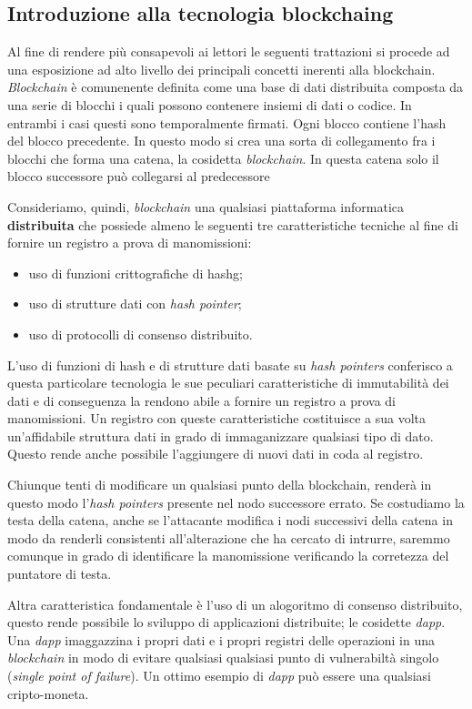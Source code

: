 \subsection{Introduzione alla tecnologia \gls{blockchaing}}
Al fine di rendere più consapevoli ai lettori le seguenti trattazioni si procede ad una esposizione ad alto livello dei principali concetti inerenti alla blockchain.
\emph{Blockchain} è comunenente definita come una base di dati distribuita composta da una serie di blocchi i quali possono contenere insiemi di dati o codice. In entrambi i casi questi sono temporalmente firmati.
Ogni blocco contiene l'hash del blocco precedente. In questo modo si crea una sorta di collegamento fra i blocchi che forma una catena, la cosidetta \emph{blockchain}. In questa catena solo il blocco successore può collegarsi al predecessore

Consideriamo, quindi, \emph{blockchain} una qualsiasi piattaforma informatica \textbf{distribuita} che possiede almeno le seguenti tre caratteristiche tecniche al fine di fornire un registro a prova di manomissioni: 
\begin{itemize}
    \item uso di funzioni crittografiche di \gls{hashg};
    \item uso di strutture dati con \emph{hash pointer};
    \item uso di protocolli di consenso distribuito.
\end{itemize}

L'uso di funzioni di hash e di strutture dati basate su \emph{hash pointers} conferisco a questa particolare tecnologia le sue peculiari caratteristiche di immutabilità dei dati e di conseguenza la rendono abile a fornire un registro a prova di manomissioni. Un registro con queste caratteristiche costituisce a sua volta un'affidabile struttura dati in grado di immaganizzare qualsiasi tipo di dato. Questo rende anche possibile l'aggiungere di nuovi dati in coda al registro. 

Chiunque tenti di modificare un qualsiasi punto della blockchain, renderà in questo modo l'\emph{hash pointers} presente nel nodo successore errato. Se costudiamo la testa della catena, anche se l'attacante modifica i nodi successivi della catena in modo da renderli consistenti all'alterazione che ha cercato di intrurre, saremmo comunque in grado di identificare la manomissione verificando la corretezza del puntatore di testa.

Altra caratteristica fondamentale è l'uso di un alogoritmo di consenso distribuito, questo rende possibile lo sviluppo di applicazioni distribuite; le cosidette \emph{dapp}. Una \emph{dapp} imaggazzina i propri dati e i propri registri delle operazioni in una \emph{blockchain} in modo di evitare qualsiasi qualsiasi punto di vulnerabiltà singolo (\emph{single point of failure}). Un ottimo esempio di \emph{dapp} può essere una qualsiasi cripto-moneta.

